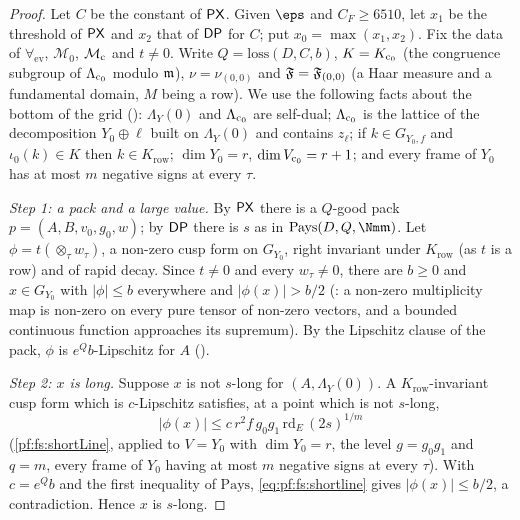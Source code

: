 \begin{proof}
Let $C$ be the constant of $\mathsf{PX}$. Given $\eps$ and $C_F\ge6510$, let $x_1$ be the threshold of $\mathsf{PX}$ and $x_2$ that of
$\mathsf{DP}$ for $C$; put $x_0=\max(x_1,x_2)$. Fix the data of $\forall_{\mathrm{ev}}$, $\mathcal M_0$, $\mathcal M_{\mathrm{c}}$ and $t\ne0$. Write
$Q=\mathrm{loss}(D,C,b)$, $K=K_{\mathrm{c}_0}$ (the congruence subgroup of $\Lambda_{\mathrm{c}_0}$ modulo $\mathfrak m$), $\nu=\nu_{(0,0)}$ and
$\mathfrak F=\mathfrak F_{(0,0)}$ (a Haar measure and a fundamental domain, $M$ being a row). We use the following facts about the bottom of the
grid (): $\Lambda_Y(0)$ and $\Lambda_{\mathrm{c}_0}$ are self-dual;
$\Lambda_{\mathrm{c}_0}$ is the lattice of the decomposition $Y_0\oplus\ell$ built on $\Lambda_Y(0)$ and contains $z_\ell$; if $k\in G_{Y_0,f}$
and $\iota_0(k)\in K$ then $k\in K_{\mathrm{row}}$; $\dim Y_0=r$, $\dim V_{\mathrm{c}_0}=r+1$; and every frame of $Y_0$ has at most $m$
negative signs at every $\tau$.

\emph{Step 1: a pack and a large value.} By $\mathsf{PX}$ there is a $Q$-good pack $p=(A,B,v_0,g_0,w)$; by $\mathsf{DP}$ there is $s$ as
in $\mathrm{Pays}(D,Q,\Nm\fsm)$. Let $\phi=t(\otimes_\tau w_\tau)$, a non-zero cusp form on $G_{Y_0}$, right invariant under
$K_{\mathrm{row}}$ (as $t$ is a row) and of rapid decay. Since $t\ne0$ and every $w_\tau\ne0$, there are $b\ge0$ and $x\in G_{Y_0}$ with
$|\phi|\le b$ everywhere and $|\phi(x)|>b/2$ (: a non-zero
multiplicity map is non-zero on every pure tensor of non-zero vectors, and a bounded continuous function approaches its supremum).
By the Lipschitz clause of the pack, $\phi$ is $e^Qb$-Lipschitz for $A$
().

\emph{Step 2: $x$ is long.} Suppose $x$ is not $s$-long for $(A,\Lambda_Y(0))$. A $K_{\mathrm{row}}$-invariant cusp form which is
$c$-Lipschitz satisfies, at a point which is not $s$-long,
\begin{equation}\label{eq:pf:fs:shortline}
|\phi(x)|\le c\,r^2f\,g_0g_1\,\mathrm{rd}_E\,(2s)^{1/m}
\end{equation}
(\cref{pf:fs:shortLine}, applied to $V=Y_0$ with $\dim Y_0=r$, the level $g=g_0g_1$ and $q=m$, every frame of $Y_0$ having at most $m$
negative signs at every $\tau$). With $c=e^Qb$ and the first inequality of $\mathrm{Pays}$,
\eqref{eq:pf:fs:shortline} gives $|\phi(x)|\le b/2$, a contradiction. Hence $x$ is $s$-long.


\end{proof}
